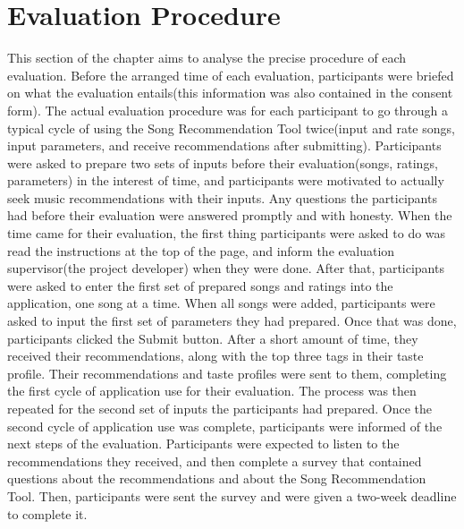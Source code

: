 \documentclass{l4proj}
\begin{document}
\section{Evaluation Procedure}
This section of the chapter aims to analyse the precise procedure of each evaluation. Before the arranged time of each evaluation, participants were briefed on what the evaluation entails(this information was also contained in the consent form). The actual evaluation procedure was for each participant to go through a typical cycle of using the Song Recommendation Tool twice(input and rate songs, input parameters, and receive recommendations after submitting). Participants were asked to prepare two sets of inputs before their evaluation(songs, ratings, parameters) in the interest of time, and participants were motivated to actually seek music recommendations with their inputs. Any questions the participants had before their evaluation were answered promptly and with honesty. When the time came for their evaluation, the first thing participants were asked to do was read the instructions at the top of the page, and inform the evaluation supervisor(the project developer) when they were done. After that, participants were asked to enter the first set of prepared songs and ratings into the application, one song at a time. When all songs were added, participants were asked to input the first set of parameters they had prepared. Once that was done, participants clicked the Submit button. After a short amount of time, they received their recommendations, along with the top three tags in their taste profile.  Their recommendations and taste profiles were sent to them, completing the first cycle of application use for their evaluation. The process was then repeated for the second set of inputs the participants had prepared. Once the second cycle of application use was complete, participants were informed of the next steps of the evaluation. Participants were expected to listen to the recommendations they received, and then complete a survey that contained questions about the recommendations and about the Song Recommendation Tool. Then, participants were sent the survey and were given a two-week deadline to complete it. 
\end{document}
